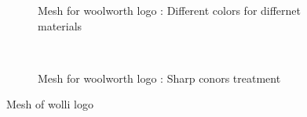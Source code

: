\begin{figure}[h!]
    \begin{subfigure}[b]{1\linewidth}
        \centering
        \caption{Mesh for woolworth logo : Different colors for differnet materials}
    \end{subfigure}
    \\
    \begin{subfigure}[b]{1\linewidth}
        \centering
        \caption{Mesh for woolworth logo : Sharp conors treatment}
        \label{qdt_ex:mesh_wolli_logo_sharp}
    \end{subfigure}
    \caption{Mesh of wolli logo}
    \label{qdt_ex:mesh_wolli_logo}
\end{figure}
